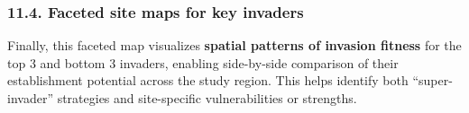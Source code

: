 \documentclass[
]{article}
\newenvironment{Shaded}{\begin{snugshade}}{\end{snugshade}}
\newcommand{\AttributeTok}[1]{\textcolor[rgb]{0.13,0.29,0.53}{#1}}
\newcommand{\CommentTok}[1]{\textcolor[rgb]{0.56,0.35,0.01}{\textit{#1}}}
\newcommand{\FunctionTok}[1]{\textcolor[rgb]{0.13,0.29,0.53}{\textbf{#1}}}
\newcommand{\NormalTok}[1]{#1}
\newcommand{\OtherTok}[1]{\textcolor[rgb]{0.56,0.35,0.01}{#1}}
\newcommand{\SpecialCharTok}[1]{\textcolor[rgb]{0.81,0.36,0.00}{\textbf{#1}}}
\begin{document}
\hypertarget{faceted-site-maps-for-key-invaders}{%
\subsubsection{11.4. Faceted site maps for key
invaders}\label{faceted-site-maps-for-key-invaders}}

Finally, this faceted map visualizes \textbf{spatial patterns of
invasion fitness} for the top 3 and bottom 3 invaders, enabling
side-by-side comparison of their establishment potential across the
study region. This helps identify both ``super-invader'' strategies and
site-specific vulnerabilities or strengths.

\begin{Shaded}
\end{Shaded}
\end{document}
